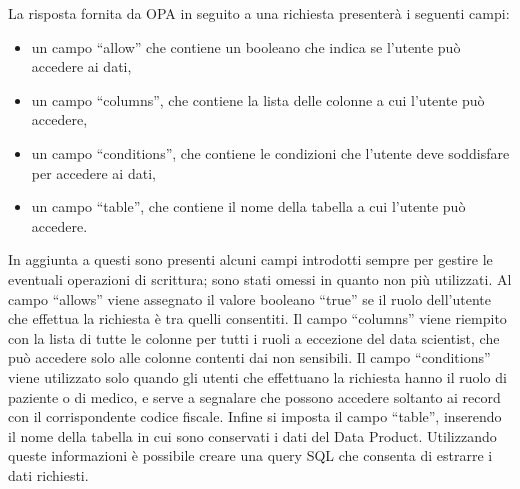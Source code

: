 \documentclass[12pt]{report}
\begin{document}
La risposta fornita da OPA in seguito a una richiesta presenterà i seguenti campi:
\begin{itemize}
    \item un campo ``allow'' che contiene un booleano che indica se l'utente può accedere ai dati,
    \item un campo ``columns'', che contiene la lista delle colonne a cui l'utente può accedere,
    \item un campo ``conditions'', che contiene le condizioni che l'utente deve soddisfare per accedere ai dati,
    \item un campo ``table'', che contiene il nome della tabella a cui l'utente può accedere.
\end{itemize}
In aggiunta a questi sono presenti alcuni campi introdotti sempre per gestire le eventuali operazioni di scrittura; sono stati omessi in quanto non più utilizzati.  
Al campo ``allows'' viene assegnato il valore booleano ``true'' se il ruolo dell'utente che effettua la richiesta è tra quelli consentiti.
Il campo ``columns'' viene riempito con la lista di tutte le colonne per tutti i ruoli a eccezione del data scientist, che può accedere solo alle colonne contenti dai non sensibili.
Il campo ``conditions'' viene utilizzato solo quando gli utenti che effettuano la richiesta hanno il ruolo di paziente o di medico, e serve a segnalare che possono accedere soltanto ai record con il corrispondente codice fiscale.
Infine si imposta il campo ``table'', inserendo il nome della tabella in cui sono conservati i dati del Data Product.
Utilizzando queste informazioni è possibile creare una query SQL che consenta di estrarre i dati richiesti.
\end{document}
